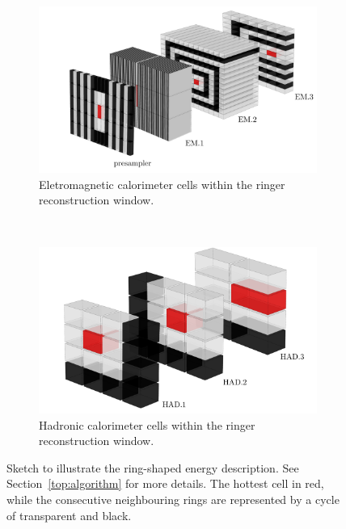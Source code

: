 \begin{figure}[h!t]
\centering
\begin{center}
\begin{subfigure}[c]{0.8\textwidth}
\centering
\includegraphics[width=\textwidth]{sections/ringer/figures/ATLAS_EM_Layers_v5.pdf}
\caption{Eletromagnetic calorimeter cells within the ringer reconstruction window.}
\end{subfigure} \\
\begin{subfigure}[c]{0.8\textwidth}
\centering
\includegraphics[width=\textwidth]{sections/ringer/figures/ATLAS_HAD_Layers_v5.pdf}
\caption{Hadronic calorimeter cells within the ringer reconstruction window.}
\end{subfigure}
\end{center}
\caption{\label{fig:calo_rings}
Sketch to illustrate the ring-shaped energy description. See
Section~\ref{top:algorithm} for more details. 
The hottest cell in red, while the consecutive neighbouring rings are represented by a cycle 
of transparent and black.
}
\end{figure}

